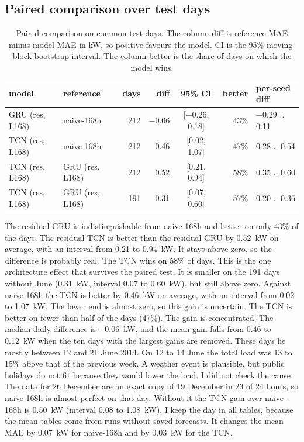 \documentclass[10pt,a4paper]{article}
\begin{document}
\subsection{Paired comparison over test days}\label{sec:paired}
\begin{table}[h]
\centering\footnotesize
\caption{Paired comparison on common test days. The column diff is reference MAE minus model MAE in kW, so positive favours the model. CI is the 95\% moving-block bootstrap interval. The column better is the share of days on which the model wins.}\label{tab:paired}
\begin{tabular}{@{}llrrcrl@{}}
\toprule
model & reference & days & diff & 95\% CI & better & per-seed diff\\
\midrule
GRU (res, L168)      & naive-168h       & 212 & $-0.06$ & [$-0.26$, 0.18]  & 43\% & $-0.29$ .. 0.11\\
TCN (res, L168)      & naive-168h       & 212 & 0.46    & [0.02, 1.07]     & 47\% & 0.28 .. 0.54\\
TCN (res, L168)      & GRU (res, L168)  & 212 & 0.52    & [0.21, 0.94]     & 58\% & 0.35 .. 0.60\\
TCN (res, L168)      & GRU (res, L168)  & 191 & 0.31    & [0.07, 0.60]     & 57\% & 0.20 .. 0.36\\
\bottomrule
\end{tabular}
\end{table}

The residual GRU is indistinguishable from naive-168h and better on only 43\% of the days. The residual TCN is better than the residual GRU by 0.52~kW on average, with an interval from 0.21 to 0.94~kW. It stays above zero, so the difference is probably real. The TCN wins on 58\% of days. This is the one architecture effect that survives the paired test. It is smaller on the 191 days without June (0.31~kW, interval 0.07 to 0.60~kW), but still above zero. Against naive-168h the TCN is better by 0.46~kW on average, with an interval from 0.02 to 1.07~kW. The lower end is almost zero, so this gain is uncertain. The TCN is better on fewer than half of the days (47\%). The gain is concentrated. The median daily difference is $-0.06$~kW, and the mean gain falls from 0.46 to 0.12~kW when the ten days with the largest gains are removed. These days lie mostly between 12 and 21 June 2014. On 12 to 14 June the total load was 13 to 15\% above that of the previous week. A weather event is plausible, but public holidays do not fit because they would lower the load. I did not check the cause. The data for 26 December are an exact copy of 19 December in 23 of 24 hours, so naive-168h is almost perfect on that day. Without it the TCN gain over naive-168h is 0.50~kW (interval 0.08 to 1.08~kW). I keep the day in all tables, because the mean tables come from runs without saved forecasts. It changes the mean MAE by 0.07~kW for naive-168h and by 0.03~kW for the TCN.
\end{document}

